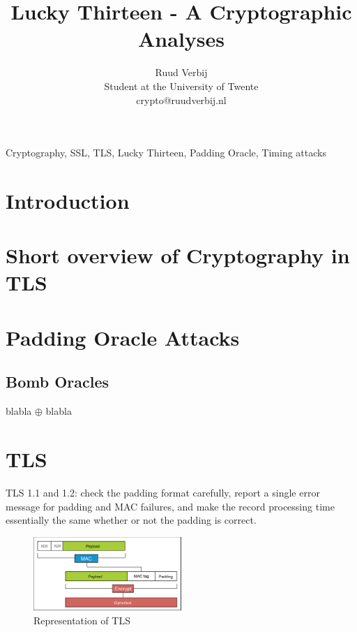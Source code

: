 \documentclass[10pt,conference,a4paper]{IEEEtran}
\title{Lucky Thirteen - A Cryptographic Analyses}
\author{Ruud Verbij \\ Student at the University of Twente \\ crypto@ruudverbij.nl}
\begin{document}
\maketitle

\begin{abstract}

\end{abstract}

\begin{IEEEkeywords}
Cryptography, SSL, TLS, Lucky Thirteen, Padding Oracle, Timing attacks
\end{IEEEkeywords}

\section{Introduction}
\label{sec:intro}

\section{Short overview of Cryptography in TLS}
\label{sec:crypto}

\section{Padding Oracle Attacks}

\label{sec:paddingoracle}
\subsection{}

\subsection{Bomb Oracles}
\label{sec:paddingoracle:bomb}
blabla $\oplus$ blabla

\section{TLS}
\label{sec:TLS}
TLS 1.1 and 1.2: check the padding format carefully, report a single error message for padding and MAC failures, and make the record processing time essentially the same whether or not the padding is correct.

\begin{figure}[h]
	\centering
	\includegraphics[width=0.5\textwidth]{tls-representation.jpg}
	\caption{Representation of TLS~\cite{alfardan2013lucky}}
	\label{fig:tls}
\end{figure}
\end{document}
